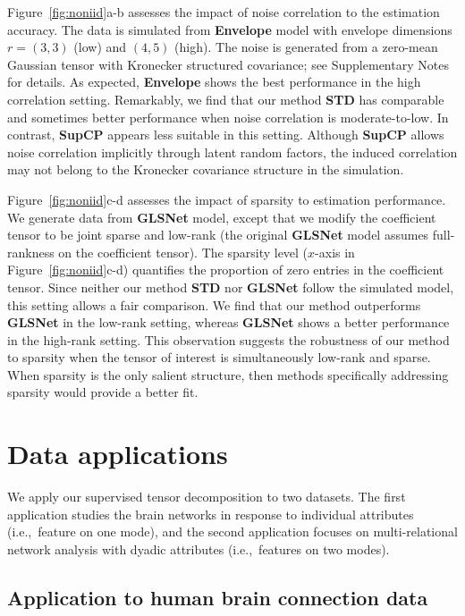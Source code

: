 \documentclass[12pt]{article}
\theoremstyle{definition}
\theoremstyle{definition}
\begin{document}
{Figure~\ref{fig:noniid}a-b assesses the impact of noise correlation to the estimation accuracy. The data is simulated from {\bf Envelope} model with envelope dimensions $r=(3,3)$ (low) and $(4,5)$ (high). The noise is generated from a zero-mean Gaussian tensor with Kronecker structured covariance; see Supplementary Notes for details. As expected, {\bf Envelope} shows the best performance in the high correlation setting. Remarkably, we find that our method {\bf STD} has comparable and sometimes better performance when noise correlation is moderate-to-low. In contrast, {\bf SupCP} appears less suitable in this setting. Although {\bf SupCP} allows noise correlation implicitly through latent random factors, the induced correlation may not belong to the Kronecker covariance structure in the simulation. 



Figure~\ref{fig:noniid}c-d assesses the impact of sparsity to estimation performance. We generate data from {\bf GLSNet} model, except that we modify the coefficient tensor to be joint sparse and low-rank (the original {\bf GLSNet} model assumes full-rankness on the coefficient tensor). 
The sparsity level ($x$-axis in Figure~\ref{fig:noniid}c-d) quantifies the proportion of zero entries in the coefficient tensor. Since neither our method {\bf STD} nor {\bf GLSNet} follow the simulated model, this setting allows a fair comparison. We find that our method outperforms {\bf GLSNet} in the low-rank setting, whereas {\bf GLSNet} shows a better performance in the high-rank setting. This observation suggests the robustness of our method to sparsity when the tensor of interest is simultaneously low-rank and sparse. When sparsity is the only salient structure, then methods specifically addressing sparsity would provide a better fit. }




\section{Data applications}\label{sec:data}
We apply our supervised tensor decomposition to two datasets. The first application studies the brain networks in response to individual attributes (i.e.,\ feature on one mode), and the second application focuses on multi-relational network analysis with dyadic attributes (i.e.,\ features on two modes). 

\subsection{Application to human brain connection data} 
\end{document}
